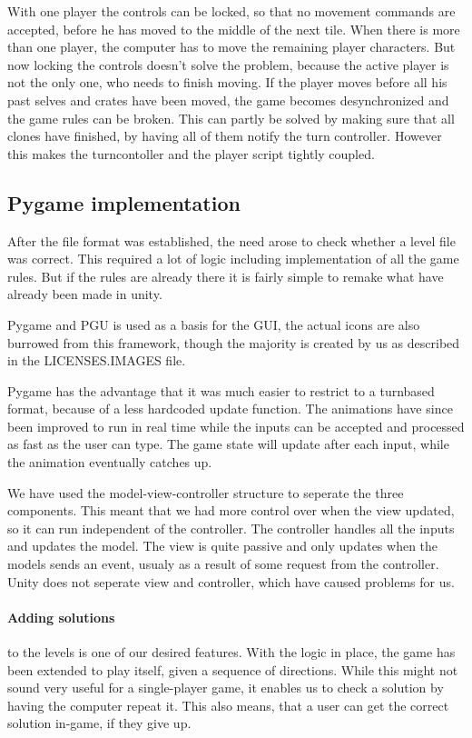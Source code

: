 With one player the controls can be locked, so that no movement commands
are accepted, before he has moved to the middle of the next tile. When
there is more than one player, the computer has to move the remaining player
characters. But now locking the controls doesn't solve the problem,
because the active player is not the only one, who needs to finish
moving. If the player moves before all his past selves and crates have
been moved, the game becomes desynchronized and the game rules can be
broken. This can partly be solved by making sure that all clones have
finished, by having all of them notify the turn controller. However this makes
the turncontoller and the player script tightly coupled.

\subsection{Pygame implementation}
After the file format was established, the need arose to check whether
a level file was correct. This required a lot of logic including
implementation of all the game rules. But if the rules are already there
it is fairly simple to remake what have already been made in unity.

Pygame and PGU is used as a basis for the GUI, the actual icons are
also burrowed from this framework, though the majority is created by us as
described in the LICENSES.IMAGES file.

Pygame has the advantage that it was much easier to restrict to a
turnbased format, because of a less hardcoded update function. The
animations have since been improved to run in real time while the inputs can
be accepted and processed as fast as the user can type. The game state
will update after each input, while the animation eventually catches up.

We have used the model-view-controller structure to seperate the three
components. This meant that we had more control over when the view
updated, so it can run independent of the controller. The controller
handles all the inputs and updates the model. The view is quite passive
and only updates when the models sends an event, usualy as a result
 of some request from the controller. Unity does not seperate view
 and controller, which have caused problems for us.

\paragraph{Adding solutions}
to the levels is one of our desired features. With the logic in place,
the game has been extended to play itself, given a sequence of directions.
While this might not sound very useful for a single-player game, it enables
us to check a solution by having the computer repeat it. This also means,
that a user can get the correct solution in-game, if they give up.

